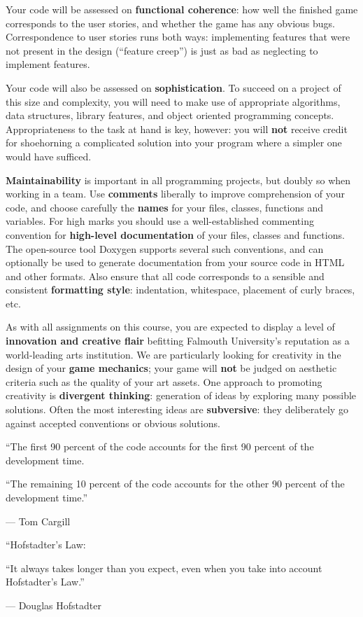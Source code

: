 \documentclass{../fal_assignment}
\begin{document}
Your code will be assessed on \textbf{functional coherence}:
how well the finished game corresponds to the user stories,
and whether the game has any obvious bugs.
Correspondence to user stories runs both ways:
implementing features that were not present in the design (``feature creep'')
is just as bad as neglecting to implement features.

Your code will also be assessed on \textbf{sophistication}.
To succeed on a project of this size and complexity,
you will need to make use of appropriate algorithms, data structures, library features, and object oriented programming concepts.
Appropriateness to the task at hand is key, however:
you will \textbf{not} receive credit for shoehorning a complicated solution into your program
where a simpler one would have sufficed.

\textbf{Maintainability} is important in all programming projects,
but doubly so when working in a team.
Use \textbf{comments} liberally to improve comprehension of your code,
and choose carefully the \textbf{names} for your files, classes, functions and variables.
For high marks you should use a well-established commenting convention
for \textbf{high-level documentation} of your files, classes and functions.
The open-source tool Doxygen supports several such conventions,
and can optionally be used to generate documentation from your source code in HTML and other formats.
Also ensure that all code corresponds to a sensible and consistent \textbf{formatting style}:
indentation, whitespace, placement of curly braces, etc.

As with all assignments on this course, you are expected to display a level of
\textbf{innovation and creative flair} befitting Falmouth University's reputation as a world-leading
arts institution.
We are particularly looking for creativity in the design of your \textbf{game mechanics};
your game will \textbf{not} be judged on aesthetic criteria such as the quality of your art assets.
One approach to promoting creativity is
\textbf{divergent thinking}: generation of ideas by exploring many possible solutions.
Often the most interesting ideas are \textbf{subversive}: they deliberately go against
accepted conventions or obvious solutions.

\begin{marginquote}
    ``The first 90 percent of the code accounts for the first 90 percent of the development time.
    
    ``The remaining 10 percent of the code accounts for the other 90 percent of the development time.''
    
    --- Tom Cargill
    
    \marginquoterule
    
    ``Hofstadter's Law:
    
    ``It always takes longer than you expect, even when you take into account Hofstadter's Law.''
    
    --- Douglas Hofstadter
\end{marginquote}
\end{document}
